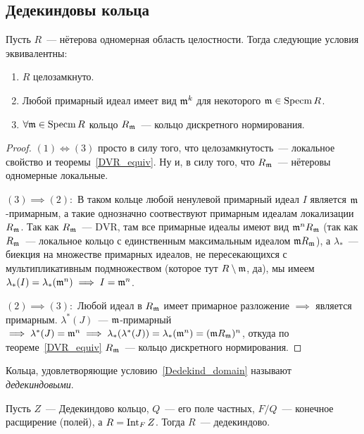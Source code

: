 	
	\subsection{Дедекиндовы кольца}

	\begin{statement}\label{Dedekind_domain} 
		Пусть $R$~--- нётерова одномерная область целостности. Тогда следующие условия эквивалентны: 
		\begin{enumerate}
			\item $R$ целозамкнуто. 
			\item Любой примарный идеал имеет вид $\mathfrak{m}^k$ для некоторого $\mathfrak{m} \in \operatorname{Specm}{R}$.
			\item $\forall \mathfrak{m} \in \operatorname{Specm}{R}$ кольцо $R_{\mathfrak{m}}$~--- кольцо дискретного нормирования. 
		\end{enumerate}
	\end{statement}

	\begin{proof}
		$(1) \Leftrightarrow (3)$ просто в силу того, что целозамкнутость~--- локальное свойство и теоремы~\ref{DVR_equiv}. Ну и, в силу того, что $R_{\mathfrak{m}}$~--- нётеровы одномерные локальные. 

		$(3) \implies (2):$ В таком кольце любой ненулевой примарный идеал $I$ является $\mathfrak{m}$-примарным, а такие однозначно соотвествуют примарным идеалам локализации $R_{\mathfrak{m}}$. Так как $R_{\mathfrak{m}}$~--- $\mathrm{DVR}$, там все примарные идеалы имеют вид $\mathfrak{m}^n R_{\mathfrak{m}}$ (так как $R_{\mathfrak{m}}$~--- локальное кольцо с единственным максимальным идеалом $\mathfrak{m} R_{\mathfrak{m}}$), а $\lambda_*$~--- биекция на множестве примарных идеалов, не пересекающихся с мультипликативным подмножеством (которое тут $R \setminus \mathfrak{m}$, да), мы имеем $\lambda_*(I) = \lambda_*(\mathfrak{m}^n) \implies I = \mathfrak{m}^n$. 

		$(2) \implies (3):$ Любой идеал в $R_{\mathfrak{m}}$ имеет примарное разложение $\implies$ является примарным. $\lambda^{*}(J)$~--- $\mathfrak{m}$-примарный  $\implies \lambda^*(J) = \mathfrak{m}^n \implies \lambda_{*}(\lambda^*(J)) = \lambda_*(\mathfrak{m}^n) = (\mathfrak{m} R_{\mathfrak{m}})^n$, откуда по теореме~\ref{DVR_equiv} $R_{\mathfrak{m}}$~--- кольцо дискретного нормирования.  
	\end{proof}

	\begin{definition} 
		Кольца, удовлетворяющие условию~\ref{Dedekind_domain} называют \emph{дедекиндовыми}. 
	\end{definition}

	\begin{theorem} 
		Пусть $Z$~--- Дедекиндово кольцо, $Q$~--- его поле частных, $F/Q$~--- конечное расщирение (полей), а $R = \operatorname{Int}_{F}{Z}$. Тогда $R$~--- дедекиндово. 
	\end{theorem}

